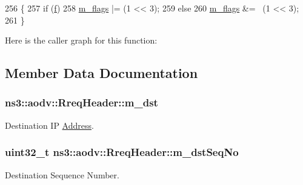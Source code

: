 \begin{DoxyCode}
256 \{
257   \textcolor{keywordflow}{if} (\hyperlink{buildings__pathloss_8m_aa52d3a6e3de5a80a97c12364caeaa125}{f})
258     \hyperlink{classns3_1_1aodv_1_1RreqHeader_af0551e8fbcf652fdb6a4e917e45f6e3b}{m\_flags} |= (1 << 3);
259   \textcolor{keywordflow}{else}
260     \hyperlink{classns3_1_1aodv_1_1RreqHeader_af0551e8fbcf652fdb6a4e917e45f6e3b}{m\_flags} &= ~(1 << 3);
261 \}
\end{DoxyCode}


Here is the caller graph for this function\+:




\subsection{Member Data Documentation}
\subsubsection[{\texorpdfstring{m\+\_\+dst}{m_dst}}]{ ns3\+::aodv\+::\+Rreq\+Header\+::m\+\_\+dst\hspace{0.3cm}{\ttfamily [private]}}\hypertarget{classns3_1_1aodv_1_1RreqHeader_a746b1707ec1e1e3e679cbe8dde54aa98}{}\label{classns3_1_1aodv_1_1RreqHeader_a746b1707ec1e1e3e679cbe8dde54aa98}


Destination IP \hyperlink{classns3_1_1Address}{Address}. 

\subsubsection[{\texorpdfstring{m\+\_\+dst\+Seq\+No}{m_dstSeqNo}}]{\setlength{\rightskip}{0pt plus 5cm}uint32\+\_\+t ns3\+::aodv\+::\+Rreq\+Header\+::m\+\_\+dst\+Seq\+No\hspace{0.3cm}{\ttfamily [private]}}\hypertarget{classns3_1_1aodv_1_1RreqHeader_ae20452555cbc98773d8dd496d15606ec}{}\label{classns3_1_1aodv_1_1RreqHeader_ae20452555cbc98773d8dd496d15606ec}


Destination Sequence Number. 


